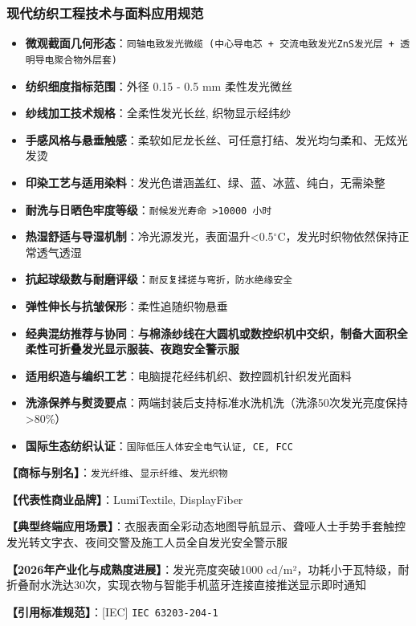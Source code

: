 \documentclass[11pt,openright,twoside,UTF8]{ctexbook}
\begin{document}
\subsubsection*{现代纺织工程技术与面料应用规范}
\begin{itemize} \setlength{\itemsep}{2pt}
    \item \textbf{微观截面几何形态}：\texttt{同轴电致发光微缆 (中心导电芯 + 交流电致发光ZnS发光层 + 透明导电聚合物外层套)}
    \item \textbf{纺织细度指标范围}：外径 0.15 - 0.5 mm 柔性发光微丝
    \item \textbf{纱线加工技术规格}：全柔性发光长丝, 织物显示经纬纱
    \item \textbf{手感风格与悬垂触感}：柔软如尼龙长丝、可任意打结、发光均匀柔和、无炫光发烫
    \item \textbf{印染工艺与适用染料}：发光色谱涵盖红、绿、蓝、冰蓝、纯白，无需染整
    \item \textbf{耐洗与日晒色牢度等级}：\texttt{耐候发光寿命 \textgreater{}10000 小时}
    \item \textbf{热湿舒适与导湿机制}：冷光源发光，表面温升\textless{}0.5$^\circ\mathrm{C}$，发光时织物依然保持正常透气透湿
    \item \textbf{抗起球级数与耐磨评级}：\texttt{耐反复揉搓与弯折，防水绝缘安全}
    \item \textbf{弹性伸长与抗皱保形}：柔性追随织物悬垂
    \item \textbf{经典混纺推荐与协同}：\textbf{与棉涤纱线在大圆机或数控织机中交织，制备大面积全柔性可折叠发光显示服装、夜跑安全警示服}
    \item \textbf{适用织造与编织工艺}：电脑提花经纬机织、数控圆机针织发光面料
    \item \textbf{洗涤保养与熨烫要点}：两端封装后支持标准水洗机洗（洗涤50次发光亮度保持\textgreater{}80\%）
    \item \textbf{国际生态纺织认证}：\texttt{国际低压人体安全电气认证, CE, FCC}
\end{itemize}
\vspace{0.2cm}

\noindent\textbf{【商标与别名】}：\texttt{发光纤维}、\texttt{显示纤维}、\texttt{发光织物}\par
\noindent\textbf{【代表性商业品牌】}：LumiTextile, DisplayFiber\par
\noindent\textbf{【典型终端应用场景】}：衣服表面全彩动态地图导航显示、聋哑人士手势手套触控发光转文字衣、夜间交警及施工人员全自发光安全警示服\par
\noindent\textbf{【2026年产业化与成熟度进展】}：发光亮度突破1000 cd/m²，功耗小于瓦特级，耐折叠耐水洗达30次，实现衣物与智能手机蓝牙连接直接推送显示即时通知\par
\noindent\textbf{【引用标准规范】}：[IEC] \texttt{IEC 63203-204-1}\par
\vspace{0.5cm}
\end{document}

